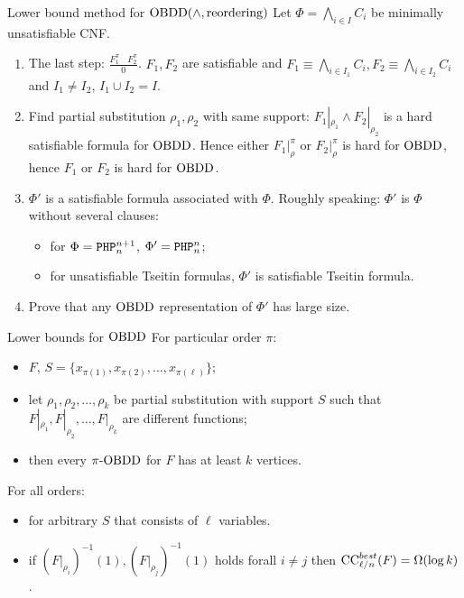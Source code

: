 \begin{frame}{Lower bound method for $\mathrm{OBDD}(\land, \mathrm{reordering})$}
	Let $\Phi = \bigwedge\limits_{i \in I} C_i$ be minimally unsatisfiable CNF.
    \pause
    \begin{enumerate}
        \item The last step: $\frac{F_1^{\pi} ~~~~ F_2^{\pi}}{0}$. $F_1, F_2$ are satisfiable and
            $F_1 \equiv \bigwedge\limits_{i \in I_1} C_i, F_2 \equiv \bigwedge\limits_{i \in I_2} C_i$
            and $I_1 \neq I_2$, $I_1 \cup I_2 = I$.
        \pause
        \item Find partial substitution $\rho_1, \rho_2$ with same support: $F_1|_{\rho_1} \land
            F_2|_{\rho_2}$ is a hard satisfiable formula for $\mathrm{OBDD}$. Hence either $F_1|_{\rho}^{\pi}$ or
            $F_2|_{\rho}^{\pi}$ is hard for $\mathrm{OBDD}$, hence $F_1$ or $F_2$ is hard for $\mathrm{OBDD}$.
        \pause
        \item $\Phi'$ is a satisfiable formula associated with $\Phi$. Roughly speaking: $\Phi'$ is
            $\Phi$ without several clauses:
            \begin{itemize}
                \item for $\Phi = \mathtt{PHP}^{n + 1}_{n}$, $\Phi' = \mathtt{PHP}^{n}_{n}$;
                \item for unsatisfiable Tseitin formulas, $\Phi'$ is satisfiable Tseitin formula.
            \end{itemize}
        \item Prove that any $\mathrm{OBDD}$ representation of $\Phi'$ has large size.
        
    \end{enumerate}    
\end{frame}


\begin{frame}{Lower bounds for $\mathrm{OBDD}$}
	For particular order $\pi$:
    \begin{itemize}
        \item $F$, $S = \{x_{\pi(1)}, x_{\pi(2)}, \dots, x_{\pi(\ell)} \}$;
        \item let $\rho_1, \rho_2, \dots, \rho_k$ be partial substitution with support $S$ such that
            $F|_{\rho_1}, F|_{\rho_2}, \dots, F|_{\rho_k}$ are different functions;
        \item then every $\pi\text{-}\mathrm{OBDD}$ for $F$ has at least $k$ vertices.
    \end{itemize}

    \pause
    For all orders:
    \begin{itemize}
        \item for arbitrary $S$ that consists of $\ell$ variables.
    \end{itemize}

    \pause

    \begin{itemize}
        \item if $(F|_{\rho_i})^{-1}(1), (F|_{\rho_j})^{-1}(1)$ holds forall $i \neq j$ then
            $\mathrm{CC}^{best}_{\ell / n} (F) = \Omega(\log k)$.
    \end{itemize}
    
\end{frame}

